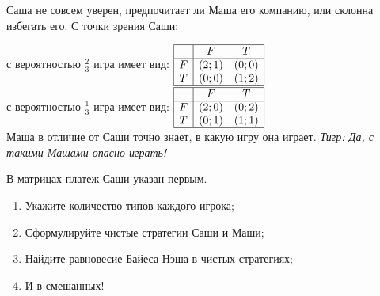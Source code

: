 \begin{problem}

Саша не совсем уверен, предпочитает ли Маша его компанию, или склонна избегать его. С точки зрения Саши:

с вероятностью  $\frac{2}{3} $  игра имеет вид:  $\begin{array}{|c|cc|}  \hline {} & {F} & {T} \\  \hline {F} & {\left(2;1\right)} & {\left(0;0\right)} \\ {T} & {\left(0;0\right)} & {\left(1;2\right)} \\  \hline  \end{array}$ \\
с вероятностью  $\frac{1}{3} $  игра имеет вид:  $\begin{array}{|c|cc|}  \hline {} & {F} & {T} \\  \hline {F} & {\left(2;0\right)} & {\left(0;2\right)} \\ {T} & {\left(0;1\right)} & {\left(1;1\right)} \\  \hline  \end{array}$ \\
Маша в отличие от Саши точно знает, в какую игру она играет.
{\it Тигр:  Да, с такими Машами опасно играть!}\par
В матрицах платеж Саши указан первым.\par
\begin{enumerate}
\item	Укажите количество типов каждого игрока;\par
\item 	Сформулируйте чистые стратегии Саши и Маши;\par
\item 	Найдите равновесие Байеса-Нэша в чистых стратегиях;\par
\item 	И в смешанных!\par
\end{enumerate}


\begin{sol}

\end{sol}
\end{problem}



